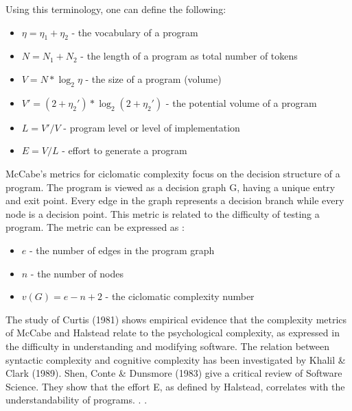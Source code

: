 \documentclass{article}
\begin{document}
Using this terminology, one can define the following:\par
\begin{itemize}
\item $\eta = \eta_1 + \eta_2 $ - the vocabulary of a program \par
\item $N = N_1 + N_2 $ - the length of a program as total number of tokens \par
\item $V = N * \log _2 \eta $ - the size of a program (volume) \par
\item $V' = (2 + \eta_2')*\log_2(2 + \eta_2')$ - the potential volume of a program \par
\item $L = V' / V $ - program level or level of implementation \par
\item $E = V / L $ - effort to generate a program
\end{itemize}

McCabe's metrics for ciclomatic complexity focus on the decision structure of a program. The program is viewed as a decision graph G, having a unique entry and exit point. Every edge in the graph represents a decision branch while every node is a decision point. This metric is related to the difficulty of testing a program. The metric can be expressed as :
\begin{itemize}
\item $e$ - the number of edges in the program graph \par
\item $n$ - the number of nodes \par
\item $v(G) = e - n + 2$ - the ciclomatic complexity number
\end{itemize}

The study of Curtis (1981) shows empirical evidence that the complexity metrics of McCabe and Halstead relate to the psychological complexity, as expressed in the difficulty in understanding and modifying software. The relation between syntactic complexity and cognitive complexity has been investigated by Khalil \& Clark (1989). Shen, Conte \& Dunsmore (1983) give a critical review of Software Science. They show that the effort E, as defined by Halstead, correlates with the understandability of programs. . \cite{DBLP:journals/infsof/BergB95}. \par
\end{document}
